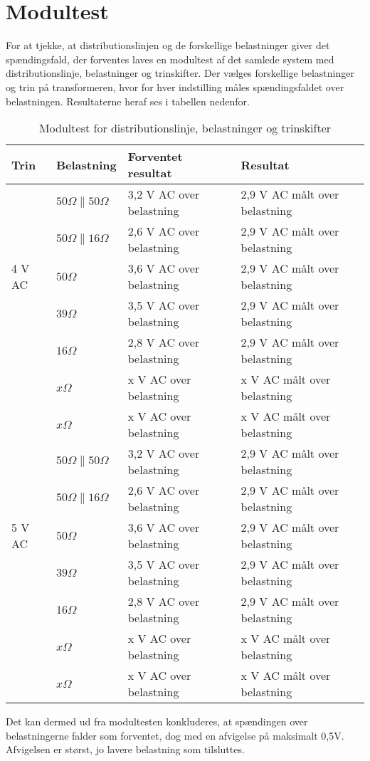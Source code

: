 

\section{Modultest}

For at tjekke, at distributionslinjen og de forskellige belastninger giver det spændingsfald, der forventes laves en modultest af det samlede system med distributionslinje, belastninger og trinskifter. Der vælges forskellige belastninger og trin på transformeren, hvor for hver indstilling måles spændingsfaldet over belastningen. Resultaterne heraf ses i tabellen nedenfor. 


\begin{table}[H]
	\centering
	\begin{tabular}{|l|l|l|l|}
		\hline
		\textbf{Trin} & \textbf{Belastning} & \textbf{Forventet resultat} & \textbf{Resultat} \\\hline
		
		\multirow{5}{*}{4 V AC} 
		& $50 \Omega\parallel 50 \Omega$ & 3,2 V AC over belastning & 2,9 V AC målt over belastning \\\hhline{~---} 	
		& $50 \Omega\parallel 16 \Omega$ & 2,6 V AC over belastning & 2,9 V AC målt over belastning \\\hhline{~---}
		& $50 \Omega$ & 3,6 V AC over belastning & 2,9 V AC målt over belastning \\\hhline{~---} 	
		& $39 \Omega$ & 3,5 V AC over belastning & 2,9 V AC målt over belastning \\\hhline{~---} 
		& $16 \Omega$ & 2,8 V AC over belastning & 2,9 V AC målt over belastning \\\hhline{~---} 
		& $x \Omega$ & x V AC over belastning & x V AC målt over belastning \\\hhline{~---} 
		& $x \Omega$ & x V AC over belastning & x V AC målt over belastning \\\hline 
	
		
		\multirow{5}{*}{5 V AC} 
		& $50 \Omega\parallel 50 \Omega$ & 3,2 V AC over belastning & 2,9 V AC målt over belastning \\\hhline{~---} 	
		& $50 \Omega\parallel 16 \Omega$ & 2,6 V AC over belastning & 2,9 V AC målt over belastning \\\hhline{~---}
		& $50 \Omega$ & 3,6 V AC over belastning & 2,9 V AC målt over belastning \\\hhline{~---} 	
		& $39 \Omega$ & 3,5 V AC over belastning & 2,9 V AC målt over belastning \\\hhline{~---} 
		& $16 \Omega$ & 2,8 V AC over belastning & 2,9 V AC målt over belastning \\\hhline{~---} 
		& $x \Omega$ & x V AC over belastning & x V AC målt over belastning \\\hhline{~---} 
		& $x \Omega$ & x V AC over belastning & x V AC målt over belastning \\\hline 
		
	\end{tabular}
	\caption{Modultest for distributionslinje, belastninger og trinskifter}
	\label{tab:Modultesttrin}
\end{table}

Det kan dermed ud fra modultesten konkluderes, at spændingen over belastningerne falder som forventet, dog med en afvigelse på maksimalt 0,5V. Afvigelsen er størst, jo lavere belastning som tilsluttes. 

